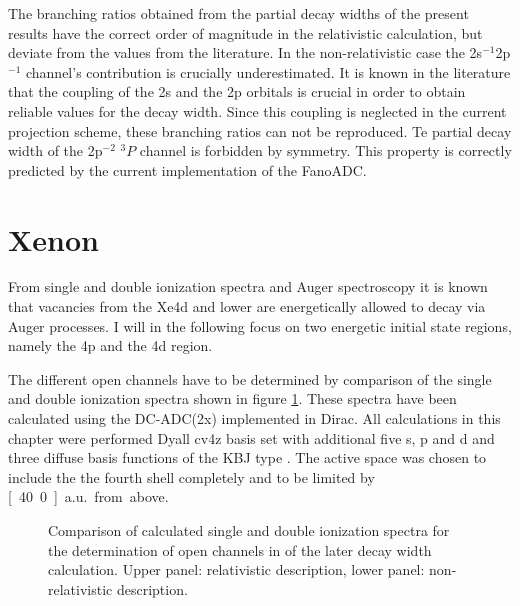 The branching ratios obtained from the partial decay widths of the present
results have the correct order of magnitude in the relativistic calculation, but
deviate from the values from the literature. In the non-relativistic case
the 2s$^{-1}$2p$^{-1}$ channel's contribution is crucially underestimated.
It is known in the literature \cite{} that
the coupling of the 2s and the 2p orbitals is crucial in order to obtain
reliable values for the decay width. Since this coupling is neglected
in the current projection scheme, these branching ratios can not be reproduced.
Te partial decay width of the 2p$^{-2}$ $^3P$ channel is forbidden by symmetry.
This property is correctly predicted by the current implementation of the
FanoADC.




\section{Xenon}
From single and double ionization spectra and Auger spectroscopy
it is known that vacancies from the Xe4d and lower are energetically allowed to
decay via Auger processes. \cite{Siegbahn69}
I will in the following focus on two energetic initial state regions, namely
the 4p and the 4d region.

The different open channels have to be determined by comparison of the single
and double ionization spectra shown in figure \ref{figure:Xe_sdip}.
These spectra have been calculated using the
DC-ADC(2x) implemented in Dirac\cite{Pernpointner04_1,Pernpointner10_1,DIRAC13}.
All calculations in this chapter were performed 
Dyall cv4z basis set\cite{dyall5p06} with additional five s, p and d
and three diffuse basis functions                       
of the \ac{KBJ} type \cite{Kaufmann89}. The active space was chosen to include the
the fourth shell completely and to be limited by \unit[40.0]{a.u.} from above.

\begin{figure}[h]
  \centering
  
  
  \caption{Comparison of calculated single and double ionization spectra
           for the determination of open channels in of the later decay
           width calculation. Upper panel: relativistic description, lower
           panel: non-relativistic description.
           }
  \label{figure:Xe_sdip}
\end{figure}
\afterpage{\clearpage}


